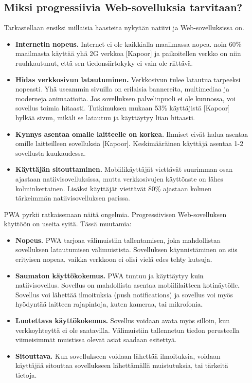 \documentclass{tktltiki}
\begin{document}
\subsection{Miksi progressiivia Web-sovelluksia tarvitaan?}
\enlargethispage{5mm}

Tarkastellaan ensiksi millaisia haasteita nykyään natiivi ja Web-sovelluksissa on.

\begin{itemize}
  \item \textbf{Internetin nopeus.} Internet ei ole kaikkialla maailmassa nopea. noin 60\% maailmasta käyttää yhä 2G verkkoa [Kapoor] ja paikoitellen verkko on niin ruuhkautunut, että sen tiedonsiirtokyky ei vain ole riittävä.
  \item \textbf{Hidas verkkosivun latautuminen.} Verkkosivun tulee latautua tarpeeksi nopeasti. Yhä useammin sivuilla on erilaisia bannereita, multimediaa ja moderneja animaatioita. Jos sovelluksen palvelinpuoli ei ole kunnossa, voi sovellus toimia hitaasti. Tutkimuksen mukaan 53\% käyttäjistä [Kapoor] hylkää sivun, mikäli se latautuu ja käyttäytyy liian hitaasti.
  \item \textbf{Kynnys asentaa omalle laitteelle on korkea.} Ihmiset eivät halua asentaa omille laitteilleen sovelluksia [Kapoor]. Keskimääräinen käyttäjä asentaa 1-2 sovellusta kuukaudessa.
  \item \textbf{Käyttäjän sitouttaminen.} Mobiilikäyttäjät viettävät suurimman osan ajastaan natiivisovelluksissa, mutta verkkosivujen käyttöaste on lähes kolminkertainen. Lisäksi käyttäjät viettävät 80\% ajastaan kolmen tärkeimmän natiivisovelluksen parissa. 
\end{itemize}

PWA pyrkii ratkaisemaan näitä ongelmia. Progressiivisen Web-sovelluksen käyttöön on useita syitä. Tässä muutamia:

\begin{itemize}
  \item \textbf{Nopeus.} PWA tarjoaa välimuistiin tallentamisen, joka mahdollistaa sovelluksen latautumisen välimuistista. Sovelluksen käynnistäminen on siis erityisen nopeaa, vaikka verkkoon ei olisi vielä edes tehty kutsuja.
  \item \textbf{Saumaton käyttökokemus.} PWA tuntuu ja käyttäytyy kuin natiivisovellus. Sovellus on mahdollista asentaa mobiililaitteen kotinäytölle. Sovellus voi lähettää ilmoituksia (push notifications) ja sovellus voi myös hyödyntää laitteen rajapintoja, kuten kameraa, tai mikrofonia. 
  \item \textbf{Luotettava käyttökokemus.} Sovellus voidaan avata myös silloin, kun verkkoyhteyttä ei ole saatavilla. Välimuistiin tallennetun tiedon perusteella viimeisimmät muistissa olevat asiat saadaan esitettyä. 
  \item \textbf{Sitouttava.} Kun sovellukseen voidaan lähettää ilmoituksia, voidaan käyttäjää sitouttaa sovellukseen lähettämällä muistutuksia, tai tärkeitä tietoja. 
\end{itemize}
\end{document}
